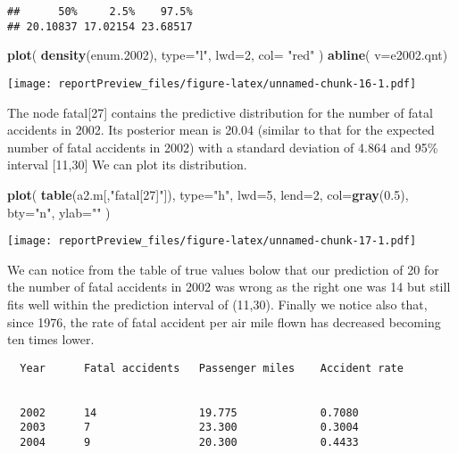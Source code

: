 \documentclass[]{article}
\newenvironment{Shaded}{\begin{snugshade}}{\end{snugshade}}
\newcommand{\KeywordTok}[1]{\textcolor[rgb]{0.13,0.29,0.53}{\textbf{#1}}}
\newcommand{\DataTypeTok}[1]{\textcolor[rgb]{0.13,0.29,0.53}{#1}}
\newcommand{\DecValTok}[1]{\textcolor[rgb]{0.00,0.00,0.81}{#1}}
\newcommand{\FloatTok}[1]{\textcolor[rgb]{0.00,0.00,0.81}{#1}}
\newcommand{\StringTok}[1]{\textcolor[rgb]{0.31,0.60,0.02}{#1}}
\newcommand{\NormalTok}[1]{#1}
\begin{document}
\begin{verbatim}
##      50%     2.5%    97.5% 
## 20.10837 17.02154 23.68517
\end{verbatim}

\begin{Shaded}
\begin{Highlighting}[]
\KeywordTok{plot}\NormalTok{( }\KeywordTok{density}\NormalTok{(enum.}\DecValTok{2002}\NormalTok{), }\DataTypeTok{type=}\StringTok{"l"}\NormalTok{, }\DataTypeTok{lwd=}\DecValTok{2}\NormalTok{, }\DataTypeTok{col=} \StringTok{"red"}\NormalTok{ )}
\KeywordTok{abline}\NormalTok{( }\DataTypeTok{v=}\NormalTok{e2002.qnt)}
\end{Highlighting}
\end{Shaded}

\texttt{[image: reportPreview\_files/figure-latex/unnamed-chunk-16-1.pdf]}

The node fatal{[}27{]} contains the predictive distribution for the
number of fatal accidents in 2002. Its posterior mean is 20.04 (similar
to that for the expected number of fatal accidents in 2002) with a
standard deviation of 4.864 and 95\% interval {[}11,30{]} We can plot
its distribution.

\begin{Shaded}
\begin{Highlighting}[]
\KeywordTok{plot}\NormalTok{( }\KeywordTok{table}\NormalTok{(a2.m[,}\StringTok{"fatal[27]"}\NormalTok{]), }\DataTypeTok{type=}\StringTok{"h"}\NormalTok{, }\DataTypeTok{lwd=}\DecValTok{5}\NormalTok{, }\DataTypeTok{lend=}\DecValTok{2}\NormalTok{, }\DataTypeTok{col=}\KeywordTok{gray}\NormalTok{(}\FloatTok{0.5}\NormalTok{), }\DataTypeTok{bty=}\StringTok{"n"}\NormalTok{, }\DataTypeTok{ylab=}\StringTok{""}\NormalTok{ )}
\end{Highlighting}
\end{Shaded}

\texttt{[image: reportPreview\_files/figure-latex/unnamed-chunk-17-1.pdf]}

We can notice from the table of true values bolow that our prediction of
20 for the number of fatal accidents in 2002 was wrong as the right one
was 14 but still fits well within the prediction interval of (11,30).
Finally we notice also that, since 1976, the rate of fatal accident per
air mile flown has decreased becoming ten times lower.

\begin{verbatim}
  Year      Fatal accidents   Passenger miles    Accident rate
               

  2002      14                19.775             0.7080
  2003      7                 23.300             0.3004
  2004      9                 20.300             0.4433
\end{verbatim}
\end{document}
